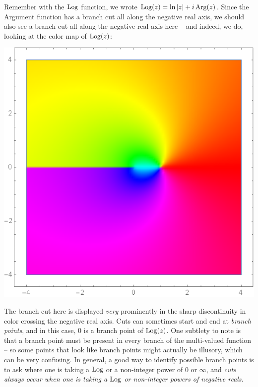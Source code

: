 Remember with the $\operatorname*{Log}$ function, we wrote $\operatorname*{Log}(z) = \ln|z| + i\operatorname*{Arg}(z)$. Since the Argument function has a branch cut all along the negative real axis, we should also see a branch cut all along the negative real axis here -- and indeed, we do, looking at the color map of $\operatorname*{Log}(z)$:
\begin{center}
    \includegraphics[scale=0.27]{images/colorlogz.png}
\end{center}
The branch cut here is displayed \textit{very} prominently in the sharp discontinuity in color crossing the negative real axis. Cuts can sometimes start and end at \textit{branch points}, and in this case, 0 is a branch point of $\operatorname*{Log}(z)$. One subtlety to note is that a branch point must be present in every branch of the multi-valued function -- so some points that look like branch points might actually be illusory, which can be very confusing. In general, a good way to identify possible branch points is to ask where one is taking a $\operatorname*{Log}$ or a non-integer power of 0 or $\infty$, and \textit{cuts always occur when one is taking a $\operatorname*{Log}$ or non-integer powers of negative reals}.

